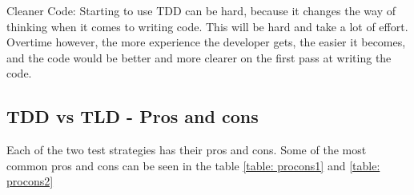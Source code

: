 Cleaner Code:
Starting to use TDD can be hard, because it changes the way of thinking when it comes to writing code. This will be hard and take a lot of effort. Overtime however, the more experience the developer gets, the easier it becomes, and the code would be better and more clearer on the first pass at writing the code.


\subsection{TDD vs TLD - Pros and cons} 

Each of the two test strategies has their pros and cons. Some of the most common pros and cons can be seen 
in the table
\ref{table: procons1} and  \ref{table: procons2}
\begin{center}

\end{center}





